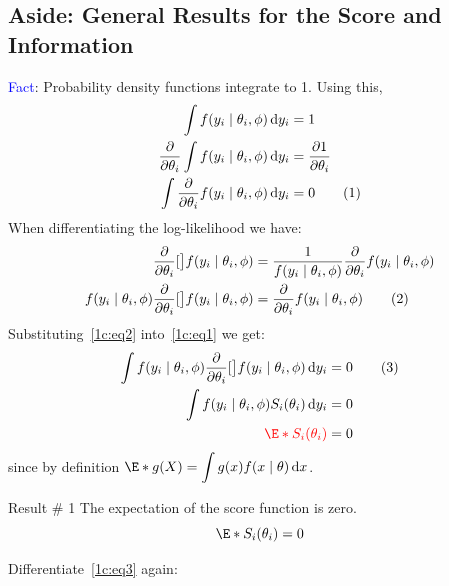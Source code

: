 \documentclass[oneside]{book}\usepackage[]{graphicx}\usepackage[svgnames]{xcolor}
\let\log\relax%
\begin{document}
\subsection*{Aside: General Results for the Score and Information}
\textcolor{Blue}{Fact}: Probability density functions integrate to 1. Using this,
\begin{align*}
      \int f(y_i\mid \theta_i,\phi)\odif{y_i}                  & =1                         \\
      \pdv*{\int f(y_i\mid \theta_i,\phi)\odif{y_i}}{\theta_i} & =\pdv{1}{\theta_i}         \\
      \int \pdv*{f(y_i\mid \theta_i,\phi)}{\theta_i}\odif{y_i} & =0\label{1c:eq1}\tag*{(1)}
\end{align*}
When differentiating the log-likelihood we have:
\begin{align*}
      \pdv*{\log[\big]{f(y_i\mid \theta_i,\phi)}}{\theta_i}                         & =\frac{1}{f(y_i\mid \theta_i,\phi)}\pdv*{f(y_i\mid \theta_i,\phi)}{\theta_i} \\
      f(y_i\mid \theta_i,\phi)\pdv*{\log[\big]{f(y_i\mid \theta_i,\phi)}}{\theta_i} & =\pdv*{f(y_i\mid \theta_i,\phi)}{\theta_i}\label{1c:eq2}\tag*{(2)}
\end{align*}
Substituting~\ref{1c:eq2} into~\ref{1c:eq1} we get:
\begin{align*}
      \int f(y_i\mid \theta_i,\phi)\pdv*{\log[\big]{f(y_i\mid \theta_i,\phi)}}{\theta_i}\odif{y_i} & =0\label{1c:eq3}\tag*{(3)} \\
      \int f(y_i\mid \theta_i,\phi)S_i(\theta_i)\odif{y_i}                                         & =0                         \\
      \textcolor{Red}{\E*{S_i(\theta_i)}}                                                          & =0
\end{align*}
since by definition $ \displaystyle \E*{g(X)}=\int g(x)f(x\mid \theta)\odif{x} $.
\begin{Result}{Result \# 1}
      The expectation of the score function is zero.
      \[ \E*{S_i(\theta_i)}=0 \]
\end{Result}
Differentiate~\ref{1c:eq3} again:
\end{document}
